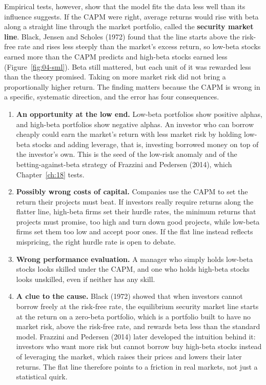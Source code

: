 Empirical tests, however, show that the model fits the data less well than its influence suggests. If the CAPM were right, average returns would rise with beta along a straight line through the market portfolio, called the \textbf{security market line}. Black, Jensen and Scholes (1972) found that the line starts above the risk-free rate and rises less steeply than the market's excess return, so low-beta stocks earned more than the CAPM predicts and high-beta stocks earned less (Figure~\ref{fig:04-sml}). Beta still mattered, but each unit of it was rewarded less than the theory promised. Taking on more market risk did not bring a proportionally higher return. The finding matters because the CAPM is wrong in a specific, systematic direction, and the error has four consequences.

\begin{enumerate}
  \item \textbf{An opportunity at the low end.} Low-beta portfolios show positive alphas, and high-beta portfolios show negative alphas. An investor who can borrow cheaply could earn the market's return with less market risk by holding low-beta stocks and adding leverage, that is, investing borrowed money on top of the investor's own. This is the seed of the low-risk anomaly and of the betting-against-beta strategy of Frazzini and Pedersen (2014), which Chapter~\ref{ch:18} tests.
  \item \textbf{Possibly wrong costs of capital.} Companies use the CAPM to set the return their projects must beat. If investors really require returns along the flatter line, high-beta firms set their hurdle rates, the minimum returns that projects must promise, too high and turn down good projects, while low-beta firms set them too low and accept poor ones. If the flat line instead reflects mispricing, the right hurdle rate is open to debate.
  \item \textbf{Wrong performance evaluation.} A manager who simply holds low-beta stocks looks skilled under the CAPM, and one who holds high-beta stocks looks unskilled, even if neither has any skill.
  \item \textbf{A clue to the cause.} Black (1972) showed that when investors cannot borrow freely at the risk-free rate, the equilibrium security market line starts at the return on a zero-beta portfolio, which is a portfolio built to have no market risk, above the risk-free rate, and rewards beta less than the standard model. Frazzini and Pedersen (2014) later developed the intuition behind it: investors who want more risk but cannot borrow buy high-beta stocks instead of leveraging the market, which raises their prices and lowers their later returns. The flat line therefore points to a friction in real markets, not just a statistical quirk.
\end{enumerate}

